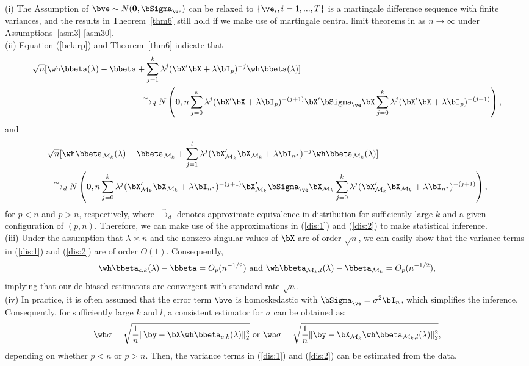 \begin{remark}\label{rm5}
(i) The Assumption of $\bve\sim N({\bf 0},\bSigma_\ve)$ can be relaxed to $\{\ve_i,i=1,...,T\}$ is a martingale difference sequence with finite variances, and the results in Theorem~\ref{thm6} still hold if we make use of martingale central limit theorems in \cite{hall2014martingale} as $n\rightarrow\infty$ under Assumptions~\ref{asm3}-\ref{asm30}.\\
   (ii) Equation (\ref{bck:rp}) and Theorem~\ref{thm6} indicate that
\begin{align}\label{dis:1}
  \sqrt{n} [\wh\bbeta(\lambda)-\bbeta&+\sum_{j=1}^k\lambda^j(\bX'\bX+\lambda\bI_p)^{-j}\wh\bbeta(\lambda)]\notag\\
   &\overset{\sim}{\longrightarrow}_d N\left({\bf 0},n\sum_{j=0}^k \lambda^j(\bX'\bX+\lambda\bI_p)^{-(j+1)}\bX'\bSigma_\ve\bX\sum_{j=0}^k \lambda^j(\bX'\bX+\lambda\bI_p)^{-(j+1)}\right),
\end{align}    
and 
\begin{align}\label{dis:2}
   &\sqrt{n}[\wh\bbeta_{\mathcal{M}_k}(\lambda)-\bbeta_{\mathcal{M}_k}+\sum_{j=1}^l\lambda^j(\bX_{\mathcal{M}_k}'\bX_{\mathcal{M}_k}+\lambda\bI_{n^*})^{-j}\wh\bbeta_{\mathcal{M}_k}(\lambda)]\notag\\
   &\overset{\sim}{\longrightarrow}_d N\left({\bf 0},n\sum_{j=0}^k \lambda^j(\bX_{\mathcal{M}_k}'\bX_{\mathcal{M}_k}+\lambda\bI_{n^*})^{-(j+1)}\bX_{\mathcal{M}_k}'\bSigma_\ve\bX_{\mathcal{M}_k}\sum_{j=0}^k \lambda^j(\bX_{\mathcal{M}_k}'\bX_{\mathcal{M}_k}+\lambda\bI_{n^*})^{-(j+1)}\right),
\end{align}   
for $p<n$ and $p>n$, respectively, where $\overset{\sim}{\longrightarrow}_d$ denotes approximate equivalence in distribution for sufficiently large $k$  and a given configuration of $(p,n)$. Therefore, we can make use of the approximations in (\ref{dis:1}) and (\ref{dis:2}) to make statistical inference.\\
(iii) Under the assumption that $\lambda\asymp n$ and the nonzero singular values of $\bX$ are of order $\sqrt{n}$,  we can easily show that the variance terms in (\ref{dis:1}) and (\ref{dis:2}) are of order $O(1)$. Consequently,
\[\wh\bbeta_{c,k}(\lambda)-\bbeta=O_p(n^{-1/2})\,\,\text{and}\,\,\wh\bbeta_{\mathcal{M}_k,l}(\lambda)-\bbeta_{\mathcal{M}_k}=O_p(n^{-1/2}),\]
implying that our de-biased estimators are convergent with standard rate $\sqrt{n}$.\\
(iv) In practice,  it is often assumed that  the error term $\bve$ is homoskedastic with $\bSigma_\ve=\sigma^2\bI_n$, which simplifies the inference. 
Consequently, for sufficiently large $k$ and $l$, a consistent estimator for $\sigma$ can be obtained as:
\[\wh\sigma=\sqrt{\frac{1}{n}\|\by-\bX\wh\bbeta_{c,k}(\lambda)\|_2^2}\,\,\text{or}\,\,\wh\sigma=\sqrt{\frac{1}{n}\|\by-\bX_{\mathcal{M}_k}\wh\bbeta_{\mathcal{M}_k,l}(\lambda)\|_2^2},\]
depending on whether $p<n$ or $p>n$. Then, the variance terms in (\ref{dis:1}) and (\ref{dis:2}) can be estimated from the data.
\end{remark}
